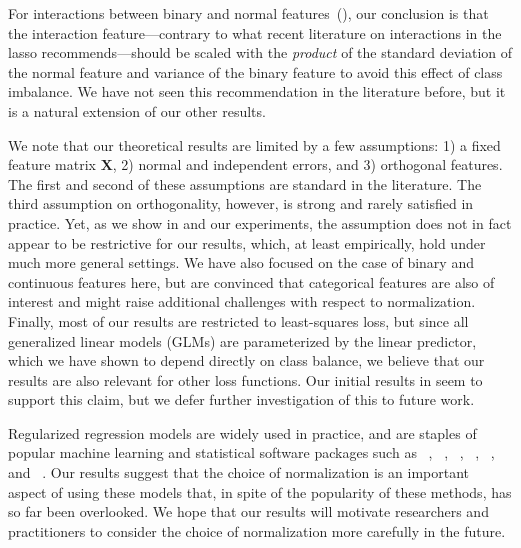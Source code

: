 For interactions between binary and normal features~(),
our conclusion is that the interaction feature---contrary to what recent literature on
interactions in the lasso recommends---should be scaled with the \emph{product} of the
standard deviation of the normal feature and variance of the binary feature to avoid this
effect of class imbalance. We have not seen this recommendation in the literature before,
but it is a natural extension of our other results.

We note that our theoretical results are limited by a few assumptions: 1) a fixed feature
matrix \(\bm{X}\), 2) normal and independent errors, and 3) orthogonal features. The first
and second of these assumptions are standard in the literature. The third assumption on
orthogonality, however, is strong and rarely satisfied in practice. Yet, as we show in
 and our experiments, the assumption does not in fact
appear to be restrictive for our results, which, at least empirically, hold under much more
general settings. We have also focused on the case of binary and continuous features here,
but are convinced that categorical features are also of interest and might raise additional
challenges with respect to normalization. Finally, most of our results are restricted to
least-squares loss, but since all generalized linear models (GLMs) are parameterized by the
linear predictor, which we have shown to depend directly on class balance, we believe that
our results are also relevant for other loss functions. Our initial results in
 seem to support this claim, but we defer further
investigation of this to future work.

Regularized regression models are widely used in practice, and are staples of popular
machine learning and statistical software packages such as
~\citep{friedman2010}, ~\citep{pedregosa2011},
~\citep{curtin2023}, ~\citep{bertrand2022},
~\citep{fan2008a}, and ~\citep{themathworksinc.2022}. Our
results suggest that the choice of normalization is an important aspect of using these
models that, in spite of the popularity of these methods, has so far been overlooked. We
hope that our results will motivate researchers and practitioners to consider the choice of
normalization more carefully in the future.
